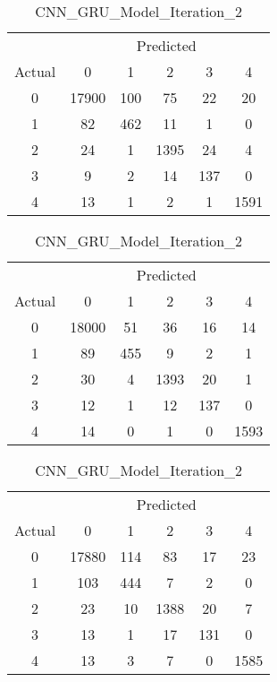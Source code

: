 \begin{table}[ht]
    \centering
    \caption{Confusion Matrices with Absolute Values (Iteration 2)}
    \label{tab:conf_abs_it2}
    \begin{minipage}{0.32\textwidth}
        \caption*{CNN\_Model\_Iteration\_2}
        \begin{tabular}{cccccc}
            \toprule
            & \multicolumn{5}{c}{Predicted} \\
            \cmidrule(lr){2-6}
            Actual & 0 & 1 & 2 & 3 & 4 \\
            \midrule
            0 & 17900 & 100 & 75  & 22  & 20  \\
            1 & 82    & 462 & 11  & 1   & 0   \\
            2 & 24    & 1   & 1395& 24  & 4   \\
            3 & 9     & 2   & 14  & 137 & 0   \\
            4 & 13    & 1   & 2   & 1   & 1591\\
            \bottomrule
        \end{tabular}
    \end{minipage}
    \hfill
    \begin{minipage}{0.32\textwidth}
        \caption*{CNN\_LSTM\_Model\_Iteration\_2}
        \begin{tabular}{cccccc}
            \toprule
            & \multicolumn{5}{c}{Predicted} \\
            \cmidrule(lr){2-6}
            Actual & 0 & 1 & 2 & 3 & 4 \\
            \midrule
            0 & 18000 & 51  & 36  & 16  & 14  \\
            1 & 89    & 455 & 9   & 2   & 1   \\
            2 & 30    & 4   & 1393& 20  & 1   \\
            3 & 12    & 1   & 12  & 137 & 0   \\
            4 & 14    & 0   & 1   & 0   & 1593\\
            \bottomrule
        \end{tabular}
    \end{minipage}
    \hfill
    \begin{minipage}{0.32\textwidth}
        \caption*{CNN\_GRU\_Model\_Iteration\_2}
        \begin{tabular}{cccccc}
            \toprule
            & \multicolumn{5}{c}{Predicted} \\
            \cmidrule(lr){2-6}
            Actual & 0 & 1 & 2 & 3 & 4 \\
            \midrule
            0 & 17880 & 114 & 83  & 17  & 23  \\
            1 & 103   & 444 & 7   & 2   & 0   \\
            2 & 23    & 10  & 1388& 20  & 7   \\
            3 & 13    & 1   & 17  & 131 & 0   \\
            4 & 13    & 3   & 7   & 0   & 1585\\
            \bottomrule
        \end{tabular}
    \end{minipage}
\end{table}

